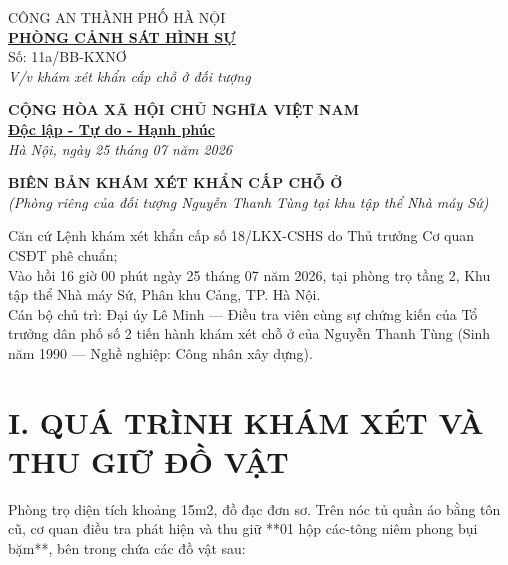 \documentclass[12pt,a4paper]{article}
\begin{document}
\noindent
\begin{minipage}[t]{0.45\textwidth}
    \begin{center}
        \small
        CÔNG AN THÀNH PHỐ HÀ NỘI\\
        \textbf{\underline{PHÒNG CẢNH SÁT HÌNH SỰ}}\\[0.1cm]
        Số: 11a/BB-KXNƠ\\
        \textit{V/v khám xét khẩn cấp chỗ ở đối tượng}
    \end{center}
\end{minipage}
\hfill
\begin{minipage}[t]{0.52\textwidth}
    \begin{center}
        \small
        \textbf{CỘNG HÒA XÃ HỘI CHỦ NGHĨA VIỆT NAM}\\
        \textbf{\underline{Độc lập - Tự do - Hạnh phúc}}\\[0.1cm]
        \textit{Hà Nội, ngày 25 tháng 07 năm 2026}
    \end{center}
\end{minipage}

\vspace{0.6cm}

\begin{center}
    \textbf{\large BIÊN BẢN KHÁM XÉT KHẨN CẤP CHỖ Ở}\\
    \textit{(Phòng riêng của đối tượng Nguyễn Thanh Tùng tại khu tập thể Nhà máy Sứ)}
\end{center}

\vspace{0.3cm}

\noindent Căn cứ Lệnh khám xét khẩn cấp số 18/LKX-CSHS do Thủ trưởng Cơ quan CSĐT phê chuẩn;\\
Vào hồi 16 giờ 00 phút ngày 25 tháng 07 năm 2026, tại phòng trọ tầng 2, Khu tập thể Nhà máy Sứ, Phân khu Cảng, TP. Hà Nội.\\
Cán bộ chủ trì: Đại úy Lê Minh — Điều tra viên cùng sự chứng kiến của Tổ trưởng dân phố số 2 tiến hành khám xét chỗ ở của Nguyễn Thanh Tùng (Sinh năm 1990 — Nghề nghiệp: Công nhân xây dựng).

\section*{I. QUÁ TRÌNH KHÁM XÉT VÀ THU GIỮ ĐỒ VẬT}
Phòng trọ diện tích khoảng 15m2, đồ đạc đơn sơ. Trên nóc tủ quần áo bằng tôn cũ, cơ quan điều tra phát hiện và thu giữ **01 hộp các-tông niêm phong bụi bặm**, bên trong chứa các đồ vật sau:
\end{document}
